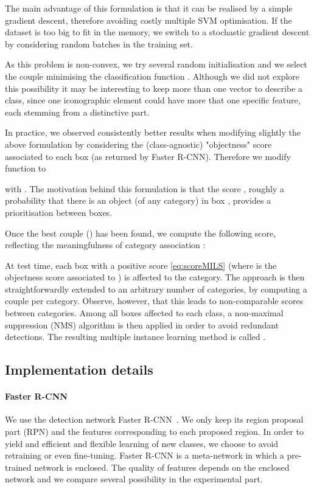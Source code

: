 \documentclass[runningheads]{llncs}
\begin{document}
The main advantage of this formulation is that it can be realised by a simple gradient descent, therefore avoiding costly multiple SVM optimisation.
If the dataset is too big to fit in the memory, we switch to a stochastic gradient descent by considering random batches in the training set.

As this problem is non-convex, we try several random initialisation and we select the couple  minimising the classification function . Although we did not explore this possibility it may be interesting to keep more than one vector to describe a class, since one iconographic element could have more that one specific feature, each stemming from a distinctive part. 



In practice, we observed consistently better results when modifying slightly the above formulation by considering the (class-agnostic) "objectness" score associated to each box (as returned by Faster R-CNN). Therefore we modify function  to 

with . 
The motivation behind this formulation is that the score , roughly a probability that there is an object (of any category) in box , provides a prioritisation between boxes.



Once the best couple () has been found, we compute the following score, reflecting the meaningfulness of category association :


At test time, each box with a positive score \eqref{eq:scoreMILS} (where  is the objectness score associated to ) is affected to the category. The approach is then straightforwardly extended to an arbitrary number of categories, by computing a couple  per category. Observe, however, that this leads to non-comparable scores between categories. 
Among all boxes affected to each class, a non-maximal suppression (NMS) algorithm is then applied in order to avoid redundant detections. The resulting multiple instance learning method is called {\bf \MIL{}}. 

\subsection{Implementation details}
\label{sec:implementation}

\paragraph{\bf Faster R-CNN} We use the detection network Faster R-CNN~\cite{ren_faster_2015}. We only keep its region proposal part (RPN) and the features corresponding to each proposed region. In order to yield and efficient and flexible learning of new classes, we choose to avoid  retraining or even fine-tuning. 
Faster R-CNN is a meta-network in which a pre-trained  network is enclosed. The quality of features depends on the enclosed network and we compare several possibility in the experimental part. 
\end{document}
